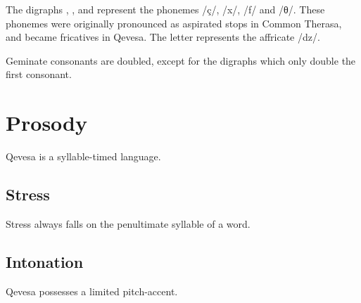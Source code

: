 \documentclass[grammar]{subfiles}
\begin{document}
The digraphs , ,  and  represent the phonemes /ç/, /x/, /f/ and
/θ/.  These phonemes were originally pronounced as aspirated stops in Common
Therasa, and became fricatives in Qevesa.  The letter  represents the
affricate /dz/.

Geminate consonants are doubled, except for the digraphs which only double the
first consonant.  




\section{Prosody}
\label{sec:prosody}

Qevesa is a syllable-timed language.
\tbw


\subsection{Stress}
\label{ssec:stress}

Stress always falls on the penultimate syllable of a word. 
\tbw


\subsection{Intonation}
\label{ssec:intonation}

Qevesa possesses a limited pitch-accent.
\tbw
\end{document}
